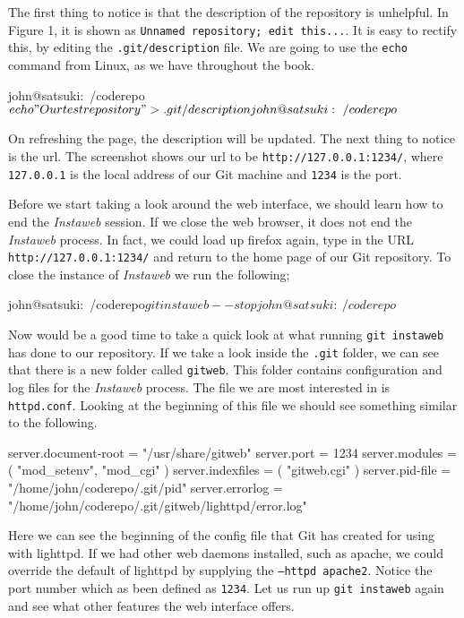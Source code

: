 
The first thing to notice is that the description of the repository is unhelpful.
In Figure 1, it is shown as \texttt{Unnamed repository; edit this...}.
It is easy to rectify this, by editing the \texttt{.git/description} file.
We are going to use the \texttt{echo} command from Linux, as we have throughout the book.

\begin{code}
john@satsuki:~/coderepo$ echo "Our test repository" > .git/description 
john@satsuki:~/coderepo$ 
\end{code}

On refreshing the page, the description will be updated.
The next thing to notice is the url.
The screenshot shows our url to be \texttt{http://127.0.0.1:1234/}, where \texttt{127.0.0.1} is the local address of our Git machine and \texttt{1234} is the port.

Before we start taking a look around the web interface, we should learn how to end the \emph{Instaweb} session.
If we close the web browser, it does not end the \emph{Instaweb} process.
In fact, we could load up firefox again, type in the URL \texttt{http://127.0.0.1:1234/} and return to the home page of our Git repository.
To close the instance of \emph{Instaweb} we run the following;

\begin{code}
john@satsuki:~/coderepo$ git instaweb --stop
john@satsuki:~/coderepo$ 
\end{code}

Now would be a good time to take a quick look at what running \texttt{git instaweb} has done to our repository.
If we take a look inside the \texttt{.git} folder, we can see that there is a new folder called \texttt{gitweb}.
This folder contains configuration and log files for the \emph{Instaweb} process.
The file we are most interested in is \texttt{httpd.conf}.
Looking at the beginning of this file we should see something similar to the following.

\begin{code}
server.document-root = "/usr/share/gitweb"
server.port = 1234
server.modules = ( "mod_setenv", "mod_cgi" )
server.indexfiles = ( "gitweb.cgi" )
server.pid-file = "/home/john/coderepo/.git/pid"
server.errorlog = "/home/john/coderepo/.git/gitweb/lighttpd/error.log"
\end{code}

Here we can see the beginning of the config file that Git has created for using with lighttpd.
If we had other web daemons installed, such as apache, we could override the default of lighttpd by supplying the \texttt{--httpd apache2}.
Notice the port number which as been defined as \texttt{1234}.
Let us run up \texttt{git instaweb} again and see what other features the web interface offers.

